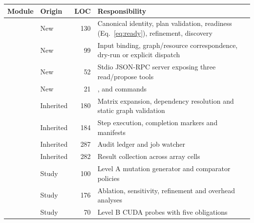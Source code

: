\begin{tabularx}{\textwidth}{llrY}
\toprule Module & Origin & LOC & Responsibility \\
\midrule
{} & New & 130 & Canonical identity, plan validation, readiness (Eq.~\ref{eq:ready}), refinement, discovery \\
 & New & 99 & Input binding, graph/resource correspondence, dry-run or explicit dispatch \\
 & New & 52 & Stdio JSON-RPC server exposing three read/propose tools \\
 & New & 21 & ,  and  commands \\
 & Inherited & 180 & Matrix expansion, dependency resolution and static graph validation \\
 & Inherited & 184 & Step execution, completion markers and manifests \\
 & Inherited & 287 & Audit ledger and job watcher \\
 & Inherited & 282 & Result collection across array cells \\
 & Study & 100 & Level A mutation generator and comparator policies \\
 & Study & 176 & Ablation, sensitivity, refinement and overhead analyses \\
 & Study & 70 & Level B CUDA probes with five obligations \\
\bottomrule
\end{tabularx}
